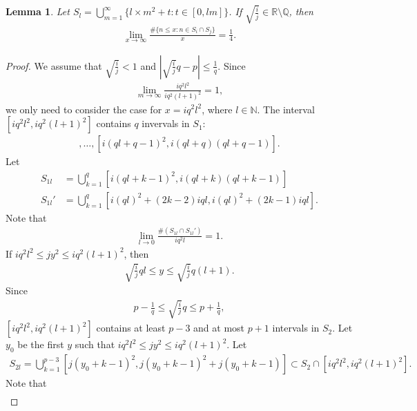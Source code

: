\documentclass[a4paper,10pt]{amsart}
\newtheorem{lemma}{Lemma}[section]
\newcommand{\R}{\mathbb R}  %
\newcommand{\N}{\mathbb N} %
\newcommand{\Q}{\mathbb Q} %
\begin{document}
\begin{lemma}\label{c_lam9}
    Let $S_{l} = \bigcup_{m=1}^{\infty}
    \{l\times m^2 + t : t \in [0, lm] \}$.
    If $\sqrt{\frac{i}{j}}  \in \R \setminus \Q$, then
    \begin{align*}
        \lim_{x \rightarrow \infty} 
        \frac{\# \{n \leq x: n \in S_{i} \cap S_{j}\}}{x} = \frac{1}{4}.
    \end{align*}
\end{lemma}

\begin{proof}
   We assume that $\sqrt{\frac{i}{j}} < 1$ and 
   $|\sqrt{\frac{i}{j}}q - p| \leq \frac{1}{q}$.
   Since
   \begin{align*}
       \lim_{m \rightarrow \infty} \frac{iq^2l^2}{iq^2(l+1)^2} = 1, 
   \end{align*}
   we only need to consider the case for $x = iq^2l^2$, where $l \in \N$. 
   The interval $[iq^2l^2, iq^2(l+1)^2]$  
   contains $q$ invervals in $S_1$: 
   \begin{align*}
       [i(ql)^2, i((ql)^2 + ql)], \ldots,  [i(ql+q-1)^2, i(ql+q)(ql+q-1)].
   \end{align*}
   Let 
   \begin{align*}
       S_{1l} &= \bigcup_{k=1}^{q} [i(ql+k-1)^2, i(ql+k)(ql+k-1)]\\ 
       S_{1l}' &= \bigcup_{k=1}^{q} [i(ql)^2+(2k-2)iql, i(ql)^2+(2k-1)iql].
   \end{align*} 
   Note that
   \begin{align*}
       \lim_{l \rightarrow 0}\frac{\# (S_{1l} \cap S_{1l}')}{iq^2l} = 1. 
   \end{align*}
   If $iq^2l^2 \leq jy^2 \leq iq^2(l+1)^2$, then 
   \begin{align*}
       \sqrt{\frac{i}{j}}ql \leq y \leq \sqrt{\frac{i}{j}}q(l+1). 
   \end{align*}
   Since
   \begin{align*}
       p - \frac{1}{q} \leq \sqrt{\frac{i}{j}}q \leq p + \frac{1}{q}, 
   \end{align*}
   $[iq^2l^2, iq^2(l+1)^2]$ contains at least $p-3$ and at most $p+1$ intervals in
   $S_2$. Let $y_0$ be the first $y$ such that 
   $iq^2l^2 \leq jy^2 \leq iq^2(l+1)^2$. Let 
   \begin{align*}
       S_{2l} = \bigcup_{k=1}^{p-3}[j(y_0 + k-1)^2, j(y_0+k-1)^2+j(y_0+k-1)] 
       \subset S_2 \cap [iq^2l^2, iq^2(l+1)^2].
   \end{align*}
   Note that 
   \begin{align*}

\end{align*}
\end{proof}
\end{document}
